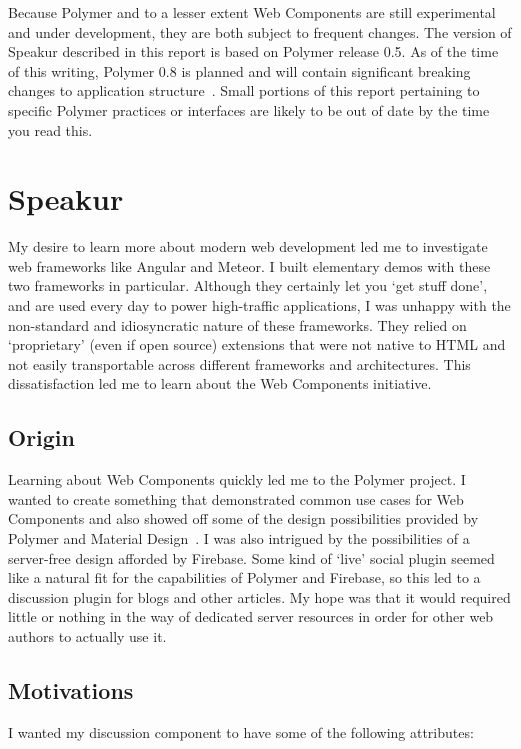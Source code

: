 Because Polymer and to a lesser extent Web Components are still experimental and under development, 
they are both subject to frequent changes.
The version of Speakur described in this report is based on Polymer release 0.5.
As of the time of this writing, Polymer 0.8 is planned and will contain significant breaking changes to application structure~\cite{michaelbleigh2015}.
Small portions of this report pertaining to specific Polymer practices or interfaces are likely to be out of date by the time you read this.

\section{Speakur}
My desire to learn more about modern web development led me to investigate web frameworks like Angular and Meteor.
I built elementary demos with these two frameworks in particular.
Although they certainly let you `get stuff done', and are used every day to power high-traffic applications, 
I was unhappy with the non-standard and idiosyncratic nature of these frameworks. 
They relied on `proprietary' (even if open source) extensions that were not native to HTML and not easily transportable across different frameworks and architectures.
This dissatisfaction led me to learn about the Web Components initiative.

\subsection{Origin}
Learning about Web Components quickly led me to the Polymer project.
I wanted to create something that demonstrated common use cases for Web Components and also showed off some of the design possibilities provided by Polymer and 
Material Design~\cite{imura2015}.
I was also intrigued by the possibilities of a server-free design afforded by Firebase.
Some kind of `live' social plugin seemed like a natural fit for the capabilities of Polymer and Firebase, so this led to a discussion plugin for blogs and other articles.
My hope was that it would required little or nothing in the way of dedicated server resources in order for other web authors to actually use it. 

\subsection{Motivations}
\label{motivations}
I wanted my discussion component to have some of the following attributes:

